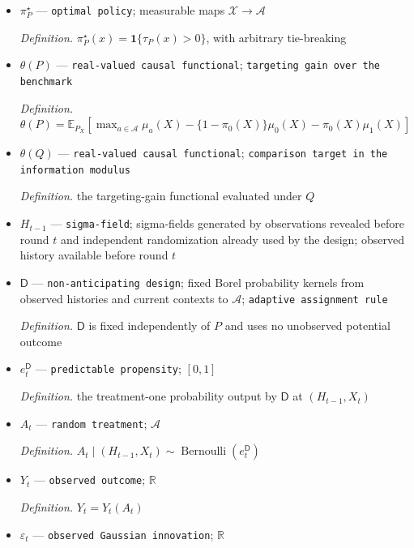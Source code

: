 \documentclass{article}
\begin{document}
\begin{itemize}
  \par\smallskip\noindent\emph{Definition.} \texttt{the explicit constant-\allowbreak{}gap Gaussian witness constructed below}
  \item \(\pi_P^\star\) --- \texttt{optimal policy}; measurable maps \(\mathcal X\to\mathcal A\)
  \par\smallskip\noindent\emph{Definition.} \(\pi_P^\star(x)=\mathbf 1\{\tau_P(x)>0\}\), with arbitrary tie-breaking
  \item \(\theta(P)\) --- \texttt{real-\allowbreak{}valued causal functional}; \texttt{targeting gain over the benchmark}
  \par\smallskip\noindent\emph{Definition.} \(\theta(P)=\mathbb E_{P_X}[\max_{a\in\mathcal A}\mu_a(X)-\{1-\pi_0(X)\}\mu_0(X)-\pi_0(X)\mu_1(X)]\)
  \item \(\theta(Q)\) --- \texttt{real-\allowbreak{}valued causal functional}; \texttt{comparison target in the information modulus}
  \par\smallskip\noindent\emph{Definition.} the targeting-gain functional evaluated under \(Q\)
  \item \(H_{t-1}\) --- \texttt{sigma-\allowbreak{}field}; sigma-fields generated by observations revealed before round \(t\) and independent randomization already used by the design; observed history available before round \(t\)
  \item \(\mathsf D\) --- \texttt{non-\allowbreak{}anticipating design}; fixed Borel probability kernels from observed histories and current contexts to \(\mathcal A\); \texttt{adaptive assignment rule}
  \par\smallskip\noindent\emph{Definition.} \(\mathsf D\) is fixed independently of \(P\) and uses no unobserved potential outcome
  \item \(e_t^{\mathsf D}\) --- \texttt{predictable propensity}; \([0,1]\)
  \par\smallskip\noindent\emph{Definition.} the treatment-one probability output by \(\mathsf D\) at \((H_{t-1},X_t)\)
  \item \(A_t\) --- \texttt{random treatment}; \(\mathcal A\)
  \par\smallskip\noindent\emph{Definition.} \(A_t\mid(H_{t-1},X_t)\sim\operatorname{Bernoulli}(e_t^{\mathsf D})\)
  \item \(Y_t\) --- \texttt{observed outcome}; \(\mathbb R\)
  \par\smallskip\noindent\emph{Definition.} \(Y_t=Y_t(A_t)\)
  \item \(\varepsilon_t\) --- \texttt{observed Gaussian innovation}; \(\mathbb R\)

\end{itemize}
\end{document}
